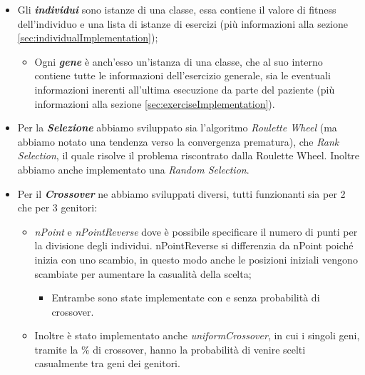 \documentclass{article}
\begin{document}
\begin{itemize}
\item Gli \textbf{\textit{individui}} sono istanze di una classe, essa contiene il valore di fitness dell'individuo e una lista di istanze di esercizi (più informazioni alla sezione \ref{sec:individualImplementation});

\begin{itemize}

\item Ogni \textbf{\textit{gene}} è anch'esso un'istanza di una classe, che al suo interno contiene tutte le informazioni dell'esercizio generale, sia le eventuali informazioni inerenti all'ultima esecuzione da parte del paziente (più informazioni alla sezione \ref{sec:exerciseImplementation}).

\end{itemize}

\item Per la \textbf{\textit{Selezione}} abbiamo sviluppato sia l'algoritmo \textit{Roulette Wheel} (ma abbiamo notato una tendenza verso la convergenza prematura), che \textit{Rank Selection}, il quale risolve il problema riscontrato dalla Roulette Wheel. Inoltre abbiamo anche implementato una \textit{Random Selection}.

\item Per il \textbf{\textit{Crossover}} ne abbiamo sviluppati diversi, tutti funzionanti sia per 2 che per 3 genitori:

\begin{itemize}

\item \textit{nPoint} e \textit{nPointReverse} dove è possibile specificare il numero di punti per la divisione degli individui. nPointReverse si differenzia da nPoint poiché inizia con uno scambio, in questo modo anche le posizioni iniziali vengono scambiate per aumentare la casualità della scelta;
\begin{itemize}
    \item Entrambe sono state implementate con e senza probabilità di crossover.
\end{itemize}
\item Inoltre è stato implementato anche \textit{uniformCrossover}, in cui i singoli geni, tramite la \% di crossover, hanno la probabilità di venire scelti casualmente tra geni dei genitori.

\end{itemize}

\pagebreak


\end{itemize}
\end{document}

